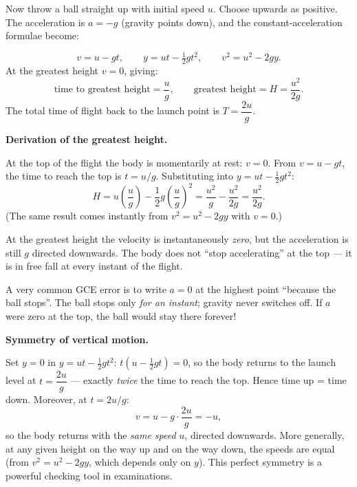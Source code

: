 \documentclass[11pt]{article}
\newcommand{\cle}[1]{{\popxbold\color{popdark}#1}}
\newcounter{popsec}
\newcounter{popsub}
\newcommand{\courssub}[1]{%
  \stepcounter{popsub}%
  \par\vspace{9pt}\noindent{\popxbold\fontsize{11.5}{13}\selectfont\color{popink}{\color{poporange}\thepopsec.\thepopsub}\hspace{6pt}#1}\par\nopagebreak\vspace{4pt}
}
\begin{document}
\courssub{Object Thrown Vertically Upwards}

Now throw a ball straight up with initial speed $u$. Choose \cle{upwards as positive}. The acceleration is $a = -g$ (gravity points down), and the constant-acceleration formulae become:

\begin{aretenir}
\[ v = u - gt, \qquad y = ut - \tfrac{1}{2}gt^{2}, \qquad v^{2} = u^{2} - 2gy. \]
At the greatest height $v = 0$, giving:
\[ \text{time to greatest height} = \frac{u}{g}, \qquad \text{greatest height} = H = \frac{u^{2}}{2g}. \]
The total time of flight back to the launch point is $T = \dfrac{2u}{g}$.
\end{aretenir}

\textbf{Derivation of the greatest height.}\par
At the top of the flight the body is momentarily at rest: $v = 0$. From $v = u - gt$, the time to reach the top is $t = u/g$. Substituting into $y = ut - \tfrac12 gt^2$:
\[ H = u\left(\frac{u}{g}\right) - \frac{1}{2}g\left(\frac{u}{g}\right)^{2} = \frac{u^{2}}{g} - \frac{u^{2}}{2g} = \frac{u^{2}}{2g}. \]
(The same result comes instantly from $v^2 = u^2 - 2gy$ with $v = 0$.)

\begin{propriete}
At the greatest height the \cle{velocity} is instantaneously \emph{zero}, but the \cle{acceleration} is still $g$ directed downwards. The body does not ``stop accelerating'' at the top — it is in free fall at every instant of the flight.
\end{propriete}

\begin{attention}
A very common GCE error is to write $a = 0$ at the highest point ``because the ball stops''. The ball stops only \emph{for an instant}; gravity never switches off. If $a$ were zero at the top, the ball would stay there forever!
\end{attention}

\textbf{Symmetry of vertical motion.}\par
Set $y = 0$ in $y = ut - \tfrac12 gt^2$: $t(u - \tfrac12 gt) = 0$, so the body returns to the launch level at $t = \dfrac{2u}{g}$ — exactly \emph{twice} the time to reach the top. Hence \cle{time up = time down}. Moreover, at $t = 2u/g$:
\[ v = u - g\cdot\frac{2u}{g} = -u, \]
so the body returns with the \emph{same speed} $u$, directed downwards. More generally, at any given height on the way up and on the way down, the speeds are equal (from $v^2 = u^2 - 2gy$, which depends only on $y$). This perfect symmetry is a powerful checking tool in examinations.
\end{document}
